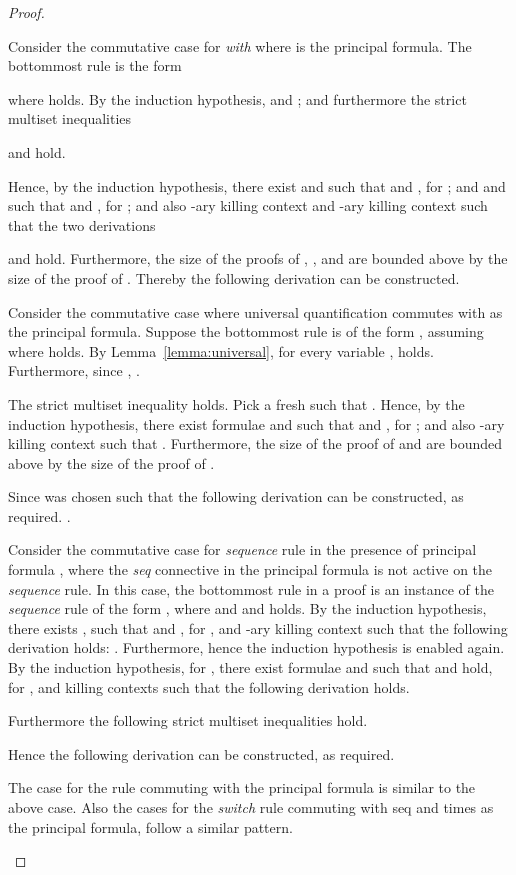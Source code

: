\begin{proof}
\begin{enumerate}[label=\textbf{\Alph*},ref=\Alph*,leftmargin=*]
{Consider the commutative case for \textit{with} where  is the principal formula. The bottommost rule is the form

where  holds.
By the induction hypothesis,  and ; and furthermore the strict multiset inequalities

and
 hold.

Hence, by the induction hypothesis, there exist  and  such that  and , for ; and  and  such that
 and , for ;
and also -ary killing context  and -ary killing context 
such that the two derivations 

and
 hold.
Furthermore, the size of the proofs of , ,  and  are bounded above by the size of the proof of .
Thereby the following derivation can be constructed.

\smallskip



Consider the commutative case where universal quantification commutes with   as the principal formula. Suppose the bottommost rule is of the form
,
 assuming 
where  holds.
By Lemma~\ref{lemma:universal}, for every variable ,  holds.
Furthermore, since , .

The strict multiset inequality  holds.
Pick a fresh  such that .
Hence, by the induction hypothesis, there exist formulae  and  such that  and , for ; and also -ary killing context  such that
.
Furthermore, the size of the proof of  and  are bounded above by the size of the proof of .

Since  was chosen such that  the following derivation can be constructed, as required.
.
\smallskip


Consider the commutative case for \textit{sequence} rule in the presence of principal formula , where the \textit{seq} connective in the principal formula is not active on the \textit{sequence} rule. In this case, the bottommost rule in a proof is an instance of the \textit{sequence} rule of the form
,
where  and  and  holds.
By the induction hypothesis, there exists ,  such that  and , for , and -ary killing context  such that the following derivation holds:
.
Furthermore,  hence the induction hypothesis is enabled again.
By the induction hypothesis, for , there exist formulae  and  such that  and  hold, for , and killing contexts  such that the following derivation holds.

Furthermore the following strict multiset inequalities hold.

Hence the following derivation can be constructed, as required.

The case for the \rseq rule commuting with the principal formula  is similar to the above case. Also the cases for the \textit{switch} rule commuting with seq and times as the principal formula, follow a similar pattern.
\smallskip

}
\end{enumerate}
\end{proof}
